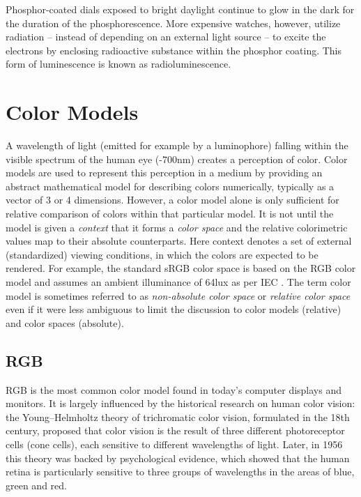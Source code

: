 \documentclass[thesis.tex]{subfiles}
\begin{document}
\noindent Phosphor-coated dials exposed to bright daylight continue to glow in the dark for the duration of the phosphorescence. More expensive watches, however, utilize radiation -- instead of depending on an external light source -- to excite the electrons by enclosing radioactive substance within the phosphor coating. This form of luminescence is known as radioluminescence.


\section{Color Models}
\label{section:rgbhsv}

A wavelength of light (emitted for example by a luminophore) falling within the visible spectrum of the human eye (-700nm) creates a perception of color. Color models are used to represent this perception in a medium by providing an abstract mathematical model for describing colors numerically, typically as a vector of 3 or 4 dimensions. However, a color model alone is only sufficient for relative comparison of colors within that particular model. It is not until the model is given a \textit{context} that it forms a \textit{color space} and the relative colorimetric values map to their absolute counterparts. Here context denotes a set of external (standardized) viewing conditions, in which the colors are expected to be rendered. For example, the standard sRGB color space is based on the RGB color model and assumes an ambient illuminance of 64lux as per IEC \cite{iec}. The term color model is sometimes referred to as \textit{non-absolute color space} or \textit{relative color space} even if it were less ambiguous to limit the discussion to color models (relative) and color spaces (absolute).

\subsection{RGB}
RGB is the most common color model found in today's computer displays and monitors. It is largely influenced by the historical research on human color vision: the Young–Helmholtz theory of trichromatic color vision, formulated in the 18th century, proposed that color vision is the result of three different photoreceptor cells (cone cells), each sensitive to different wavelengths of light. Later, in 1956 this theory was backed by psychological evidence, which showed that the human retina is particularly sensitive to three groups of wavelengths in the areas of blue, green and red. \cite{svaetichin}
\end{document}
